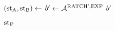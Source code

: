 \algrenewcommand\textproc{}
  \algrenewcommand{}

  \begin{minipage}{.5\linewidth}
    {\fontsize{8}{10}\selectfont
    \begin{algorithmic}[1]
      \State $(\text{st}_\text{A},\text{st}_\text{B}) \gets$ 
      \State $b' \gets \mathcal{A}^{\text{RATCH',EXP}}$
      \State \Return $b'$
      \EndProcedure
    \end{algorithmic}
    }
  \end{minipage}

  \vline

  \algrenewcommand\textproc{}
  \algrenewcommand{}

  \begin{minipage}{.5\linewidth}
    {\fontsize{8}{10}\selectfont
    \begin{algorithmic}[1]
      \State \Return {}
      \EndProcedure

      \item[] %

      \State \Return $\text{st}_\text{P}$ 
      \EndProcedure
    \end{algorithmic}
   }
 \end{minipage}%
